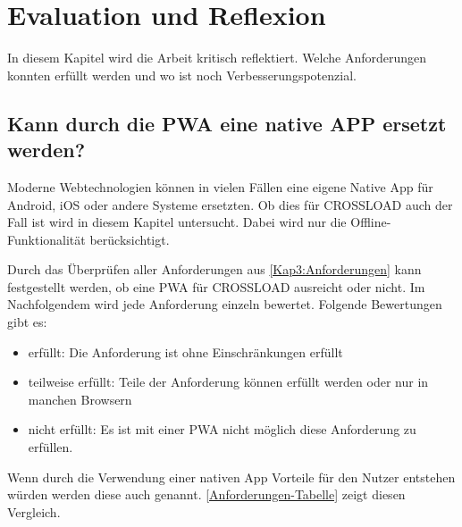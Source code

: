 \chapter{Evaluation und Reflexion}
\label{Kap6}
In diesem Kapitel wird die Arbeit kritisch reflektiert. Welche Anforderungen konnten erfüllt werden und wo ist noch Verbesserungspotenzial.

\section{Kann durch die PWA eine native APP ersetzt werden?}
Moderne Webtechnologien können in vielen Fällen eine eigene Native App für Android, iOS oder andere Systeme ersetzten. Ob dies für CROSSLOAD auch der Fall ist wird in diesem Kapitel untersucht. Dabei wird nur die Offline-Funktionalität berücksichtigt.

Durch das Überprüfen aller Anforderungen aus \autoref{Kap3:Anforderungen} kann festgestellt werden, ob eine \ac{PWA} für CROSSLOAD ausreicht oder nicht. Im Nachfolgendem wird jede Anforderung einzeln bewertet. Folgende Bewertungen gibt es:
\begin{itemize}
\item erfüllt: Die Anforderung ist ohne Einschränkungen erfüllt
\item teilweise erfüllt: Teile der Anforderung können erfüllt werden oder nur in manchen Browsern
\item nicht erfüllt: Es ist mit einer \ac{PWA} nicht möglich diese Anforderung zu erfüllen.
\end{itemize}

Wenn durch die Verwendung einer nativen App Vorteile für den Nutzer entstehen würden werden diese auch genannt. \autoref{Anforderungen-Tabelle} zeigt diesen Vergleich.

